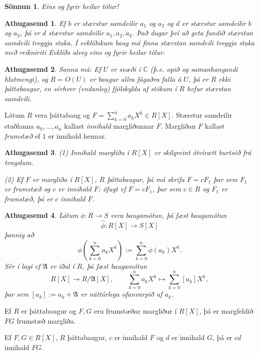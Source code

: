 \documentclass[a4paper,icelandic,11pt]{book}
\theoremstyle{plain}
\newtheorem*{ath}{Athugasemd}
\newtheorem*{sonnun}{Sönnun}
\newcommand{\C}{\mathbb{C}}
\begin{document}
\begin{sonnun}
  Eins og fyrir heilar tölur!
\end{sonnun}
\begin{ath}
  Ef $b$ er stærstur samdeilir $a_1$ og $a_2$ og $d$ er stærstur samdeilir
  $b$ og $a_3$, þá er $d$ stærstur samdeilir $a_1,a_2,a_3$. Það dugar því
  að geta fundið stærstan samdeili \emph{tveggja} staka. Í \emph{evklíðskum}
  baug má finna stærstan samdeili tveggja staka með \emph{reikniriti
  Evklíðs} alveg eins og fyrir heilar tölur.
\end{ath}
\begin{ath}
  Sanna má: Ef $U$ er svæði í $\C$ (þ.e. opið og samanhangandi hlutmengi),
  og $R=O(U)$ er baugur allra fágaðra falla á $U$, þá er $R$ ekki
  þáttabaugur, en sérhver (endanleg) fjölskylda af stökum  í $R$ hefur
  stærstan samdeili.
\end{ath}
\begin{skilgr}
  Látum $R$ vera þáttabaug og $F = \sum_{k=0}^n a_k X^k \in R[X]$. Stærstur
  samdeilir stuðlanna $a_0,\dots,a_n$ kallast \emph{innihald} margliðunnar $F$. Margliðan $F$ kallast
  \emph{frumstæð} ef
  $1$ er innihald hennar.
\end{skilgr}
\begin{ath}
  (1) Innihald margliðu í $R[X]$ er skilgreint ótvírætt \emph{burtséð frá tengslum}.

  (2) Ef $F$ er margliða í $R[X]$, $R$ þáttabaugur, þá má skrifa $F=cF_1$ þar
  sem $F_1$ er frumstæð og $c$ er innihald $F$; öfugt ef $F=cF_1$, þar sem $c\in
  R$ og $F_1$ er frumstæð, þá er $c$ innihald $F$.
\end{ath}
\begin{ath}
  Látum $\phi: R\to S$ vera baugamótun, þá fæst baugamótun
  \[ \hat\phi : R[X] \to S[X] \]
  þannig að
  \[ \phi
  \left(
    \sum_{k=0}^n a_k X^k
  \right)
  := \sum_{k=0}^n \phi(a_k)X^k.
  \]
  Sér í lagi ef $\mathfrak A$ er íðal í $R$, þá fæst baugamótun
  \[
  R[X]\to R/\mathfrak A[X],
  \qquad
  \sum_{k=0}^n a_kX^k \mapsto \sum_{k=0}^n[a_k]X^k,
  \]
  þar sem $[a_k] := a_k + \mathfrak A$ er náttúrlega ofanvarpið af $a_k$.
\end{ath}
\begin{hjalparsetn}
  [Gauss]
  Ef $R$ er þáttabaugur og $F,G$ eru frumstæðar margliður í $R[X]$, þá er
  margfeldið $FG$ frumstæð margliða.
\end{hjalparsetn}
\begin{fylgisetn}
  Ef $F,G\in R[X]$, $R$ þáttabaugur, $c$ er innihald $F$ og $d$ er innihald $G$,
  þá er $cd$ innihald $FG$.
\end{fylgisetn}
\end{document}
